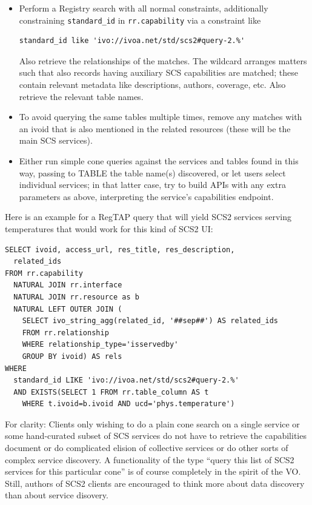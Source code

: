 \documentclass[11pt,a4paper]{ivoa}
\begin{document}
\begin{itemize}
\item Perform a Registry search with all normal constraints, additionally
constraining \verb|standard_id| in \verb|rr.capability| via a constraint
like
\begin{lstlisting}
standard_id like 'ivo://ivoa.net/std/scs2#query-2.%'
\end{lstlisting}
Also retrieve the relationships of the matches.  The wildcard arranges
matters such that also records having auxiliary SCS capabilities are
matched; these contain
relevant metadata like descriptions, authors, coverage, etc.  Also
retrieve the relevant table names.

\item To avoid querying the same tables multiple times, remove any
matches with an ivoid that is also mentioned in the related resources
(these will be the main SCS services).

\item Either run simple cone queries against the services and tables
found in this way, passing to TABLE the table name(s) discovered, or let
users select individual services; in that latter case, try to build APIs
with any extra parameters as above, interpreting the service's
capabilities endpoint.
\end{itemize}

Here is an example for a RegTAP query that will yield SCS2 services
serving temperatures that would work for this kind of SCS2 UI:

\begin{lstlisting}
SELECT ivoid, access_url, res_title, res_description,
  related_ids
FROM rr.capability
  NATURAL JOIN rr.interface
  NATURAL JOIN rr.resource as b
  NATURAL LEFT OUTER JOIN (
    SELECT ivo_string_agg(related_id, '##sep##') AS related_ids
    FROM rr.relationship
    WHERE relationship_type='isservedby'
    GROUP BY ivoid) AS rels
WHERE
  standard_id LIKE 'ivo://ivoa.net/std/scs2#query-2.%'
  AND EXISTS(SELECT 1 FROM rr.table_column AS t
    WHERE t.ivoid=b.ivoid AND ucd='phys.temperature')
\end{lstlisting}

For clarity: Clients only wishing to do a plain cone search on a single
service or some hand-curated subset of SCS services do not have to
retrieve the capabilities document or do complicated elision of
collective services or do other sorts of complex service discovery.  A
functionality of the type ``query this list of SCS2 services for this
particular cone'' is of course completely in the spirit of the VO.
Still, authors of SCS2 clients are encouraged
to think more about data discovery
than about service disovery.
\end{document}
